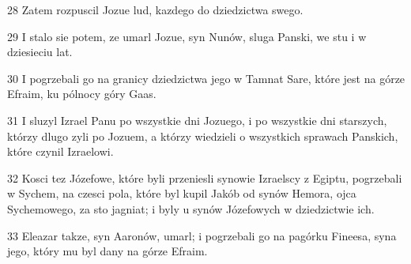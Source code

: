 \par 28 Zatem rozpuscil Jozue lud, kazdego do dziedzictwa swego.
\par 29 I stalo sie potem, ze umarl Jozue, syn Nunów, sluga Panski, we stu i w dziesieciu lat.
\par 30 I pogrzebali go na granicy dziedzictwa jego w Tamnat Sare, które jest na górze Efraim, ku pólnocy góry Gaas.
\par 31 I sluzyl Izrael Panu po wszystkie dni Jozuego, i po wszystkie dni starszych, którzy dlugo zyli po Jozuem, a którzy wiedzieli o wszystkich sprawach Panskich, które czynil Izraelowi.
\par 32 Kosci tez Józefowe, które byli przeniesli synowie Izraelscy z Egiptu, pogrzebali w Sychem, na czesci pola, które byl kupil Jakób od synów Hemora, ojca Sychemowego, za sto jagniat; i byly u synów Józefowych w dziedzictwie ich.
\par 33 Eleazar takze, syn Aaronów, umarl; i pogrzebali go na pagórku Fineesa, syna jego, który mu byl dany na górze Efraim.


